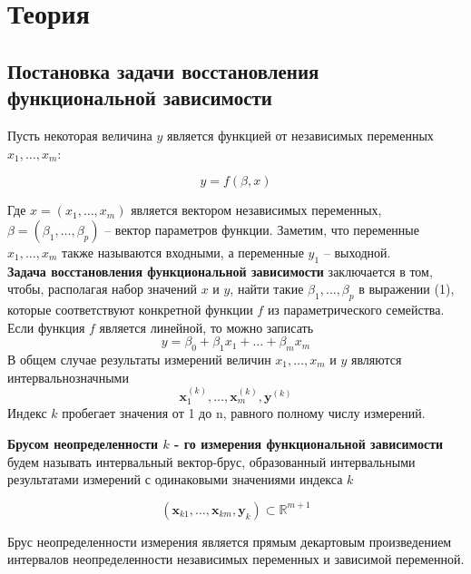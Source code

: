 \section{Теория}

\subsection{Постановка задачи восстановления функциональной зависимости}

Пусть некоторая величина $y$ является функцией от независимых переменных $x_1, \ldots, x_m$:

\begin{equation}
	y = f(\beta, x)
\end{equation}

Где $x = (x_1, \ldots, x_m)$ является вектором независимых переменных, $\beta = (\beta_1, \ldots, \beta_p)$ -- вектор параметров функции. Заметим, что переменные $x_1, \ldots, x_m$ также называются входными, а переменные $y_1$ -- выходной. \\
\textbf{Задача восстановления функциональной зависимости} заключается в том, чтобы, располагая набор значений $x$ и $y$, найти такие $\beta_1, \ldots, \beta_p$ в выражении (1), которые соответствуют конкретной функции $f$ из параметрического семейства. \\
Если функция $f$ является линейной, то можно записать 
\begin{equation}
	y = \beta_0 + \beta_1 x_1 + \ldots + \beta_m x_m
\end{equation}
В общем случае результаты измерений величин $x_1, \ldots, x_m$ и $y$ являются интервальнозначными 
\begin{equation*}
	\bm{x}_1^(k), \ldots, \bm{x}_m^{(k)}, \bm{y}^(k)
\end{equation*} 
Индекс $k$ пробегает значения от 1 до n, равного полному числу измерений. 

\textbf{Брусом неопределенности $k$ - го измерения функциональной зависимости} будем называть интервальный вектор-брус, образованный интервальными результатами измерений с одинаковыми значениями индекса $k$

\begin{equation}
	(\bm{x}_{k1}, \ldots, \bm{x}_{km}, \bm{y}_k) \subset  \mathbb{R}^{m+1}
\end{equation}

Брус неопределенности измерения является прямым декартовым произведением интервалов неопределенности независимых переменных и зависимой переменной. 

